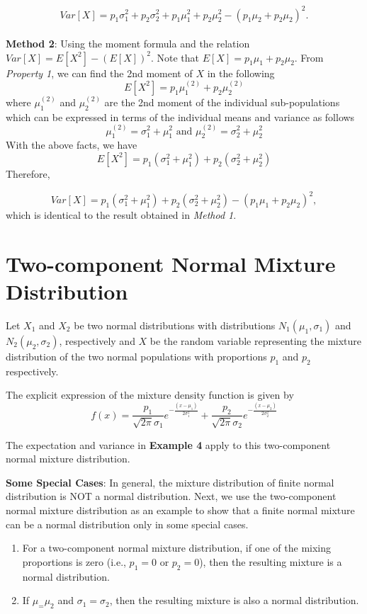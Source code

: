 \documentclass[
]{book}
\begin{document}
\[
Var[X] =  p_1\sigma_1^2 + p_2\sigma_2^2  + p_1\mu_1^2 + p_2\mu_2^2 -(p_1\mu_2+p_2\mu_2)^2.
\]\\

\textbf{Method 2}: Using the moment formula and the relation \(Var[X] = E[X^2] - (E[X])^2\).
Note that \(E[X] = p_1\mu_1 + p_2\mu_2\). From \emph{Property 1}, we can find the 2nd moment of \(X\) in the following
\[
E[X^2] = p_1\mu_1^{(2)} + p_2\mu_2^{(2)}
\]
where \(\mu_1^{(2)}\) and \(\mu_2^{(2)}\) are the 2nd moment of the individual sub-populations which can be expressed in terms of the individual means and variance as follows
\[
\mu_1^{(2)} = \sigma_1^2 + \mu_1^2 \mbox{ and } \mu_2^{(2)} = \sigma_2^2 + \mu_2^2
\]
With the above facts, we have
\[
E[X^2] = p_1(\sigma_1^2 + \mu_1^2) + p_2(\sigma_2^2 + \mu_2^2)
\]
Therefore,

\[
Var[X]   = p_1(\sigma_1^2 + \mu_1^2) + p_2(\sigma_2^2 + \mu_2^2) - ( p_1\mu_1 + p_2\mu_2)^2,
\]
which is identical to the result obtained in \emph{Method 1}.

\hfill\break

\hypertarget{two-component-normal-mixture-distribution}{%
\section{Two-component Normal Mixture Distribution}\label{two-component-normal-mixture-distribution}}

Let \(X_1\) and \(X_2\) be two normal distributions with distributions \(N_1(\mu_1, \sigma_1)\) and \(N_2(\mu_2, \sigma_2)\), respectively and \(X\) be the random variable representing the mixture distribution of the two normal populations with proportions \(p_1\) and \(p_2\) respectively.

The explicit expression of the mixture density function is given by
\[
f(x) = \frac{p_1}{\sqrt{2\pi}\sigma_1}e^{-\frac{(x-\mu_1)}{2\sigma_1^2}} +  \frac{p_2}{\sqrt{2\pi}\sigma_2}e^{-\frac{(x-\mu_2)}{2\sigma_2^2}}
\]

The expectation and variance in \textbf{Example 4} apply to this two-component normal mixture distribution.

\textbf{Some Special Cases}: In general, the mixture distribution of finite normal distribution is NOT a normal distribution. Next, we use the two-component normal mixture distribution as an example to show that a finite normal mixture can be a normal distribution only in some special cases.

\begin{enumerate}
\def\labelenumi{\arabic{enumi}.}
\item
  For a two-component normal mixture distribution, if one of the mixing proportions is zero (i.e., \(p_1 = 0\) or \(p_2 = 0\)), then the resulting mixture is a normal distribution.
\item
  If \(\mu_=\mu_2\) and \(\sigma_1 = \sigma_2\), then the resulting mixture is also a normal distribution.
\end{enumerate}
\end{document}
